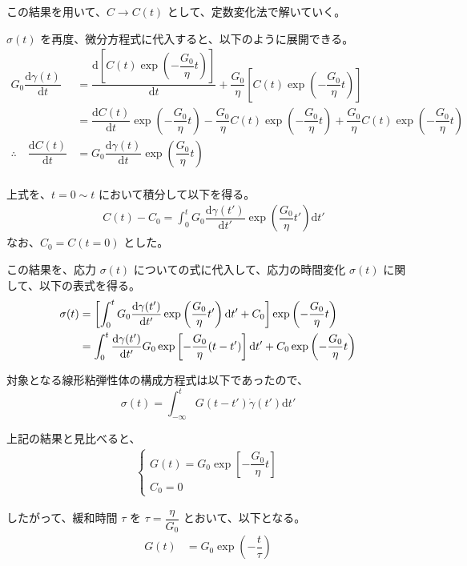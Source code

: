 \documentclass[uplatex,dvipdfmx,a4paper,11pt]{jsarticle}
\newcommand{\diff}{\mathrm d}
\newcommand{\difd}[2]{\dfrac{\diff #1}{\diff #2}}
\begin{document}
\begin{enumerate}
この結果を用いて、$C \rightarrow C (t)$ として、定数変化法で解いていく。

$\sigma(t)$ を再度、微分方程式に代入すると、以下のように展開できる。
\begin{align*}
G_0 \difd{\gamma (t)}{t}  
	&= \difd{\left[ C(t) \exp \left(-\dfrac{G_0}{\eta} t \right) \right] }{t} + \dfrac{G_0}{\eta} \left[ C(t) \exp \left(-\dfrac{G_0}{\eta} t \right) \right] \\[10pt]
	&= \difd{C(t)}{t}\exp \left(-\dfrac{G_0}{\eta} t \right) -\dfrac{G_0}{\eta} C(t) \exp \left(-\dfrac{G_0}{\eta} t \right) + \dfrac{G_0}{\eta} C(t) \exp \left(-\dfrac{G_0}{\eta} t \right) \\
\therefore \quad \difd{C(t)}{t} & = G_0 \difd{\gamma (t)}{t} \exp \left(\dfrac{G_0}{\eta} t \right) \\
\end{align*}

上式を、$t=0 \sim t$ において積分して以下を得る。
\begin{align*}
\quad C(t) - C_0 = \int_0^t G_0 \difd{\gamma (t')}{t'} 
	\exp \left(\dfrac{G_0}{\eta} t' \right) \diff t'
\end{align*}
なお、$C_0 = C(t=0)$ とした。

この結果を、応力 $\sigma(t)$ についての式に代入して、応力の時間変化 $\sigma(t) $ に関して、以下の表式を得る。
\begin{align*}
\sigma(t) 
	&= \left[\int_0^t G_0 \difd{\gamma (t')}{t'} \exp \left(\dfrac{G_0}{\eta} t' \right) \diff t' + C_0 \right] \exp \left(- \dfrac{G_0}{\eta} t \right) \notag \\
%
	&= \int_0^t \difd{\gamma (t')}{t'} 
		G_0 \exp \left[ -\dfrac{G_0}{\eta} (t-t') \right] \diff t' 
		+ C_0 \exp \left(- \dfrac{G_0}{\eta} t \right)
\end{align*}

対象となる線形粘弾性体の構成方程式は以下であったので、
\begin{equation*}
\sigma(t)=\int_{-\infty}^{t} G(t - t')\dot{\gamma}(t') \diff t'
\end{equation*}

上記の結果と見比べると、
\begin{align}
\begin{cases}
G(t) = G_0 \exp \left[ -\dfrac{G_0}{\eta} t \right] \\
C_0 = 0
\end{cases}
\end{align}

したがって、緩和時間 $\tau$ を $\tau = \dfrac{\eta}{G_0}$ とおいて、以下となる。
\begin{align*}
G(t) 
	&= G_0 \exp \left(-\dfrac{t}{\tau} \right)
\end{align*}


\end{enumerate}
\end{document}
